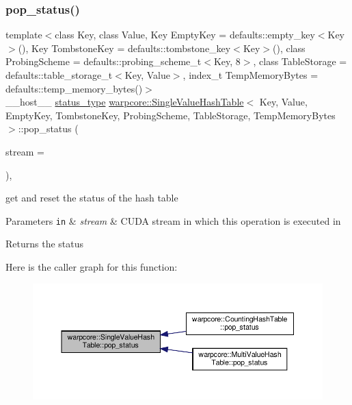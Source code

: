 \subsubsection{\texorpdfstring{pop\+\_\+status()}{pop\_status()}}
{\footnotesize\ttfamily template$<$class Key, class Value, Key Empty\+Key = defaults\+::empty\+\_\+key$<$\+Key$>$(), Key Tombstone\+Key = defaults\+::tombstone\+\_\+key$<$\+Key$>$(), class Probing\+Scheme = defaults\+::probing\+\_\+scheme\+\_\+t$<$\+Key, 8$>$, class Table\+Storage = defaults\+::table\+\_\+storage\+\_\+t$<$\+Key, Value$>$, index\+\_\+t Temp\+Memory\+Bytes = defaults\+::temp\+\_\+memory\+\_\+bytes()$>$ \\
\+\_\+\+\_\+host\+\_\+\+\_\+ \hyperlink{classwarpcore_1_1Status}{status\+\_\+type} \hyperlink{classwarpcore_1_1SingleValueHashTable}{warpcore\+::\+Single\+Value\+Hash\+Table}$<$ Key, Value, Empty\+Key, Tombstone\+Key, Probing\+Scheme, Table\+Storage, Temp\+Memory\+Bytes $>$\+::pop\+\_\+status (\begin{DoxyParamCaption}\item[{cuda\+Stream\+\_\+t}]{stream = {} }\end{DoxyParamCaption})\hspace{0.3cm}{\ttfamily [inline]}, {\ttfamily [noexcept]}}



get and reset the status of the hash table 


\begin{DoxyParams}[1]{Parameters}
\mbox{\tt in}  & {\em stream} & C\+U\+DA stream in which this operation is executed in \\
\hline
\end{DoxyParams}
\begin{DoxyReturn}{Returns}
the status 
\end{DoxyReturn}
Here is the caller graph for this function\+:
\nopagebreak
\begin{figure}[H]
\begin{center}
\leavevmode
\includegraphics[width=350pt]{classwarpcore_1_1SingleValueHashTable_ad69a615811e4116c99b15648e9259bf7_icgraph}
\end{center}
\end{figure}
\mbox{\label{classwarpcore_1_1SingleValueHashTable_a6dd2ebec90629a6501d1d8a4bab279a8}} 
